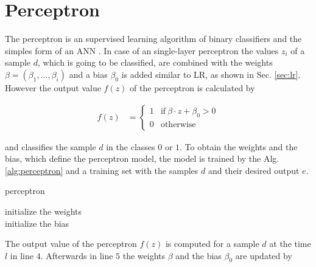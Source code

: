 
\section{Perceptron}
\label{sec:perceptron}

The perceptron is an supervised learning algorithm of binary classifiers and the simples form of an \ac{ANN} \cite{Rosenblatt1957TheAutomaton}. 
In case of an single-layer perceptron the values $z_i$ of a sample $d$, which is going to be classified, are combined with the weights $\beta =(\beta_1, ..., \beta_i)$ and a bias $\beta_0$ is added similar to \ac{LR}, as shown in Sec. \ref{sec:lr}.
However the output value $f(z)$ of the perceptron is calculated by

\begin{align*}
f(z) &= \begin{cases}
1 & \text{if}\ \beta \cdot z + \beta_0 > 0\\
0 & \text{otherwise}
\end{cases}
\end{align*}

and classifies the sample $d$ in the classes $0$ or $1$.
To obtain the weights and the bias, which define the perceptron model, the model is trained by the Alg. \ref{alg:perceptron} and a training set with the samples $d$ and their desired output $e$.

\SetAlCapHSkip{0.2em}
\begin{algorithm}[H]
\Indm
\SetAlgoLined
\caption{perceptron}
\label{alg:perceptron}
\Indp

initialize the weights\\ %
initialize the bias\\ %

\end{algorithm}

The output value of the perceptron $f(z)$ is computed for a sample $d$ at the time $l$ in line $4$.
Afterwards in line $5$ the weights $\beta$ and the bias $\beta_0$ are updated by

